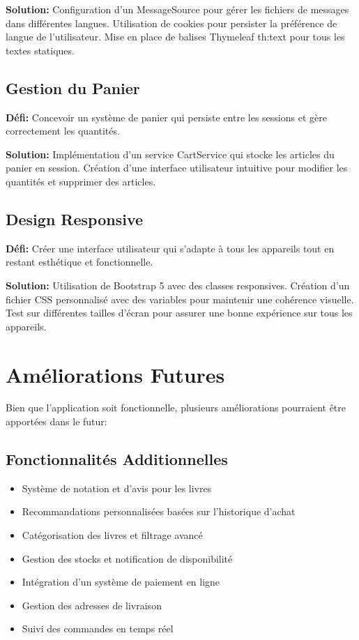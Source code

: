 \documentclass[12pt,a4paper]{report}
\begin{document}
\textbf{Solution:} Configuration d'un MessageSource pour gérer les fichiers de messages dans différentes langues. Utilisation de cookies pour persister la préférence de langue de l'utilisateur. Mise en place de balises Thymeleaf th:text pour tous les textes statiques.

\section{Gestion du Panier}
\textbf{Défi:} Concevoir un système de panier qui persiste entre les sessions et gère correctement les quantités.

\textbf{Solution:} Implémentation d'un service CartService qui stocke les articles du panier en session. Création d'une interface utilisateur intuitive pour modifier les quantités et supprimer des articles.

\section{Design Responsive}
\textbf{Défi:} Créer une interface utilisateur qui s'adapte à tous les appareils tout en restant esthétique et fonctionnelle.

\textbf{Solution:} Utilisation de Bootstrap 5 avec des classes responsives. Création d'un fichier CSS personnalisé avec des variables pour maintenir une cohérence visuelle. Test sur différentes tailles d'écran pour assurer une bonne expérience sur tous les appareils.

\chapter{Améliorations Futures}

Bien que l'application soit fonctionnelle, plusieurs améliorations pourraient être apportées dans le futur:

\section{Fonctionnalités Additionnelles}
\begin{itemize}
    \item Système de notation et d'avis pour les livres
    \item Recommandations personnalisées basées sur l'historique d'achat
    \item Catégorisation des livres et filtrage avancé
    \item Gestion des stocks et notification de disponibilité
    \item Intégration d'un système de paiement en ligne
    \item Gestion des adresses de livraison
    \item Suivi des commandes en temps réel
\end{itemize}
\end{document}
